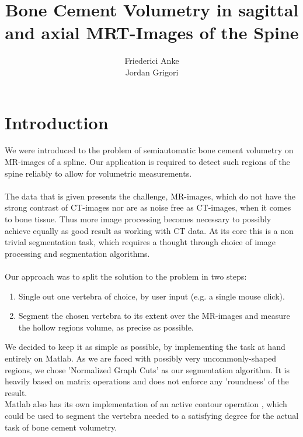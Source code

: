 \documentclass{article}
\title{Bone Cement Volumetry in sagittal and axial MRT-Images of the Spine}
\author{Friederici Anke\\ Jordan Grigori}
\begin{document}
  
  \begin{titlepage}
    \centering
    
  \end{titlepage}
  
  \maketitle
  \thispagestyle{empty}
  \pagebreak
  
  \section{Introduction}
  \setcounter{page}{1}
  {
    We were introduced to the problem of semiautomatic bone cement volumetry 
    on MR-images of a spline.
    Our application is required 
    to detect such regions of the spine reliably to allow for volumetric measurements.\\
    \\The data that is given presents the challenge, MR-images, which do not have
    the strong contrast of CT-images nor are as noise free as CT-images, when it
    comes to bone tissue. Thus more image processing becomes necessary to possibly 
    achieve equally as good result as working with CT data.
    At its core this is a non trivial segmentation task, which requires a thought 
    through choice of image processing and segmentation algorithms.\\
    \\Our approach was to split the solution to the problem in two steps:
    \begin{enumerate}
      \item Single out one vertebra of choice, by user input (e.g. a single mouse click).
      \item Segment the chosen vertebra to its extent over the MR-images and measure the hollow regions volume, as precise as possible.
    \end{enumerate}
    We decided to keep it as simple as possible, by implementing the task at hand 
    entirely on Matlab. 
    As we are faced with possibly very uncommonly-shaped regions, we chose 'Normalized Graph Cuts' \cite{[ShiMalik00]} as our segmentation algorithm.
    It is heavily based on matrix operations and does not enforce any 'roundness' of the result.
    \\Matlab also has its own implementation of an active contour
    operation \cite{[ChanVese01]}, which could be used to segment the vertebra needed to a satisfying degree for the actual task of bone cement volumetry.\\	
}
\end{document}
